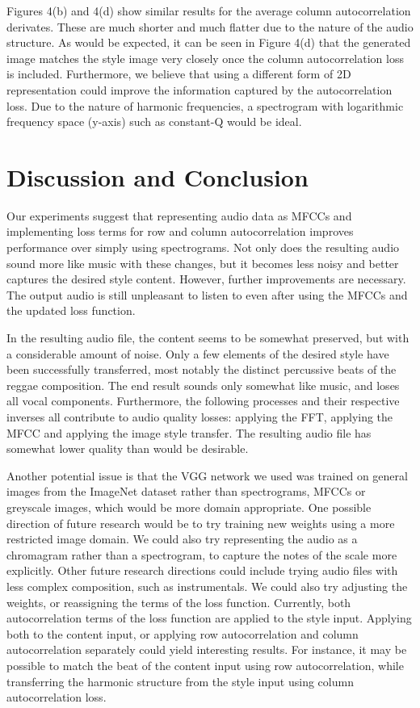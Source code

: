 \documentclass{article}
\begin{document}
Figures 4(b) and 4(d) show similar results for the average column autocorrelation derivates. These are much shorter and much flatter due to the nature of the audio structure. As would be expected, it can be seen in Figure 4(d) that the generated image matches the style image very closely once the column autocorrelation loss is included. Furthermore, we believe that using a different form of 2D representation could improve the information captured by the autocorrelation loss. Due to the nature of harmonic frequencies, a spectrogram with logarithmic frequency space (y-axis) such as constant-Q would be ideal.

\section{Discussion and Conclusion}

Our experiments suggest that representing audio data as MFCCs and implementing loss terms for row and column autocorrelation improves performance over simply using spectrograms. Not only does the resulting audio sound more like music with these changes, but it becomes less noisy and better captures the desired style content. However, further improvements are necessary. The output audio is still unpleasant to listen to even after using the MFCCs and the updated loss function.

In the resulting audio file, the content seems to be somewhat preserved, but with a considerable amount of noise. Only a few elements of the desired style have been successfully transferred, most notably the distinct percussive beats of the reggae composition. The end result sounds only somewhat like music, and loses all vocal components. Furthermore, the following processes and their respective inverses all contribute to audio quality losses: applying the FFT, applying the MFCC and applying the image style transfer. The resulting audio file has somewhat lower quality than would be desirable.

Another potential issue is that the VGG network we used was trained on general images from the ImageNet dataset rather than spectrograms, MFCCs or greyscale images, which would be more domain appropriate. One possible direction of future research would be to try training new weights using a more restricted image domain. We could also try representing the audio as a chromagram rather than a spectrogram, to capture the notes of the scale more explicitly. Other future research directions could include trying audio files with less complex composition, such as instrumentals. We could also try adjusting the weights, or reassigning the terms of the loss function. Currently, both autocorrelation terms of the loss function are applied to the style input. Applying both to the content input, or applying row autocorrelation and column autocorrelation separately could yield interesting results. For instance, it may be possible to match the beat of the content input using row autocorrelation, while transferring the harmonic structure from the style input using column autocorrelation loss.
\end{document}
